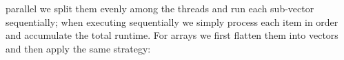 parallel we split them evenly among the threads and run each sub-vector
sequentially; when executing sequentially we simply process each item in order
and accumulate the total runtime.  For arrays we first flatten them into
vectors and then apply the same strategy:
\begin{mathpar}
\end{mathpar}
